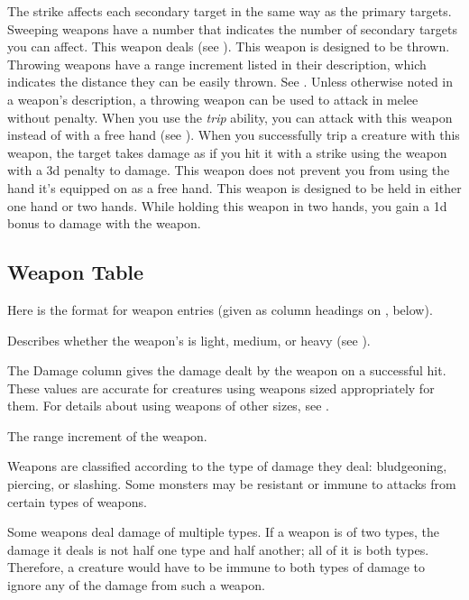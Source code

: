             The strike affects each secondary target in the same way as the primary targets.
            Sweeping weapons have a number that indicates the number of secondary targets you can affect.
             This weapon deals  (see ).
             This weapon is designed to be thrown. Throwing weapons have a range increment listed in their description, which indicates the distance they can be easily thrown. See .
            Unless otherwise noted in a weapon's description, a throwing weapon can be used to attack in melee without penalty.
             When you use the \textit{trip} ability, you can attack with this weapon instead of with a free hand (see ).
            When you successfully trip a creature with this weapon, the target takes damage as if you hit it with a strike using the weapon with a \minus3d penalty to damage.
             This weapon does not prevent you from using the hand it's equipped on as a free hand.
             This weapon is designed to be held in either one hand or two hands.
            While holding this weapon in two hands, you gain a \plus1d bonus to damage with the weapon.

    \subsection{Weapon Table}
        Here is the format for weapon entries (given as column headings on , below).

         Describes whether the weapon's  is light, medium, or heavy (see ).

         The Damage column gives the damage dealt by the weapon on a successful hit.
        These values are accurate for creatures using weapons sized appropriately for them.
        For details about using weapons of other sizes, see .

         The range increment of the weapon.

         Weapons are classified according to the type of damage they deal: bludgeoning, piercing, or slashing. Some monsters may be resistant or immune to attacks from certain types of weapons.

        Some weapons deal damage of multiple types. If a weapon is of two types, the damage it deals is not half one type and half another; all of it is both types. Therefore, a creature would have to be immune to both types of damage to ignore any of the damage from such a weapon.

